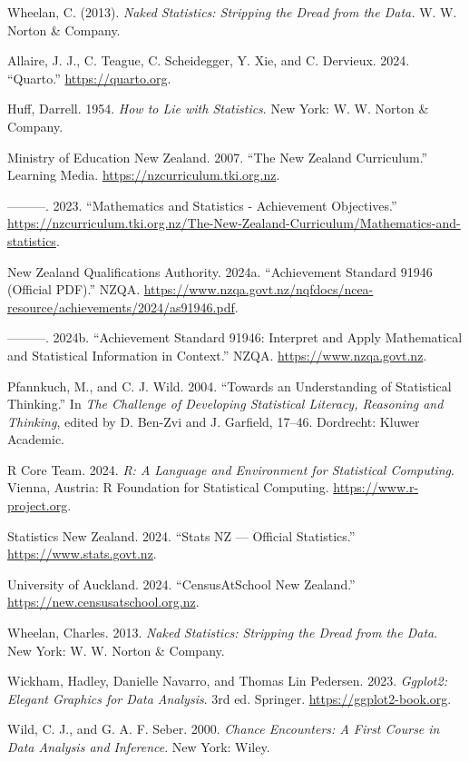 \documentclass[
  11pt,
  a4paper,
  oneside,
  open=any]{scrbook}
\newlength{\cslhangindent}
\newenvironment{CSLReferences}[2] %
 {\begin{list}{}{%
  \setlength{\itemindent}{0pt}
  \setlength{\leftmargin}{0pt}
  \setlength{\parsep}{0pt}
  \ifodd #1
   \setlength{\leftmargin}{\cslhangindent}
   \setlength{\itemindent}{-1\cslhangindent}
  \fi
  \setlength{\itemsep}{#2\baselineskip}}}
 {\end{list}}
\begin{document}
Wheelan, C. (2013). \emph{Naked Statistics: Stripping the Dread from the
Data.} W. W. Norton \& Company.

\label{refs}
\begin{CSLReferences}{1}{0}
Allaire, J. J., C. Teague, C. Scheidegger, Y. Xie, and C. Dervieux.
2024. {``Quarto.''} \url{https://quarto.org}.

Huff, Darrell. 1954. \emph{How to Lie with Statistics}. New York: W. W.
Norton \& Company.

Ministry of Education New Zealand. 2007. {``The New Zealand
Curriculum.''} Learning Media. \url{https://nzcurriculum.tki.org.nz}.

---------. 2023. {``Mathematics and Statistics - Achievement
Objectives.''}
\url{https://nzcurriculum.tki.org.nz/The-New-Zealand-Curriculum/Mathematics-and-statistics}.

New Zealand Qualifications Authority. 2024a. {``Achievement Standard
91946 (Official PDF).''} NZQA.
\url{https://www.nzqa.govt.nz/nqfdocs/ncea-resource/achievements/2024/as91946.pdf}.

---------. 2024b. {``Achievement Standard 91946: Interpret and Apply
Mathematical and Statistical Information in Context.''} NZQA.
\url{https://www.nzqa.govt.nz}.

Pfannkuch, M., and C. J. Wild. 2004. {``Towards an Understanding of
Statistical Thinking.''} In \emph{The Challenge of Developing
Statistical Literacy, Reasoning and Thinking}, edited by D. Ben-Zvi and
J. Garfield, 17--46. Dordrecht: Kluwer Academic.

R Core Team. 2024. \emph{{R}: A Language and Environment for Statistical
Computing}. Vienna, Austria: R Foundation for Statistical Computing.
\url{https://www.r-project.org}.

Statistics New Zealand. 2024. {``Stats NZ --- Official Statistics.''}
\url{https://www.stats.govt.nz}.

University of Auckland. 2024. {``CensusAtSchool New Zealand.''}
\url{https://new.censusatschool.org.nz}.

Wheelan, Charles. 2013. \emph{Naked Statistics: Stripping the Dread from
the Data}. New York: W. W. Norton \& Company.

Wickham, Hadley, Danielle Navarro, and Thomas Lin Pedersen. 2023.
\emph{Ggplot2: Elegant Graphics for Data Analysis}. 3rd ed. Springer.
\url{https://ggplot2-book.org}.

Wild, C. J., and G. A. F. Seber. 2000. \emph{Chance Encounters: A First
Course in Data Analysis and Inference}. New York: Wiley.

\end{CSLReferences}


\backmatter
\end{document}
